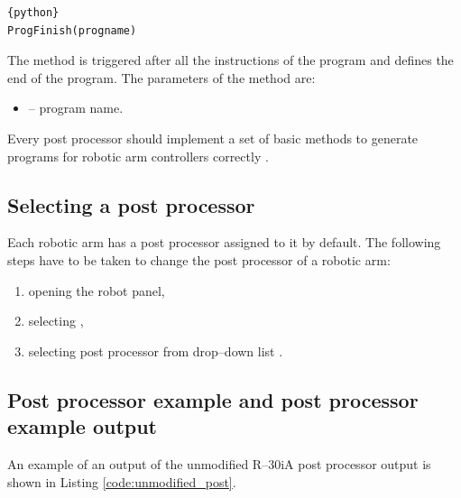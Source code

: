 \begin{lstlisting}[frame=lines,numbers=none,breaklines=true]{python}
ProgFinish(progname)
\end{lstlisting}
The  method is triggered after all the instructions of the program and defines the end of the program. The parameters of the  method are:

\begin{itemize}

\item {} -- program name.

\end{itemize}
 Every post processor should implement a set of basic methods to generate programs for robotic arm controllers correctly \cite{postmethods}.


\subsection{Selecting a post processor}

Each robotic arm has a post processor assigned to it by default. The following steps have to be taken to change the post processor of a robotic arm:


\begin{enumerate}
    \item opening the robot panel,
    \item selecting ,
    \item selecting post processor from drop--down list \cite{selectpost}.
\end{enumerate}

\subsection{Post processor example and post processor example output}

An example of an output of the unmodified R--30iA post processor output is shown in Listing \ref{code:unmodified_post}.


